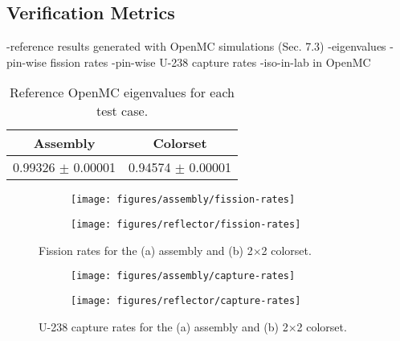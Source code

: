 \subsection{Verification Metrics}
\label{subsec:metrics}

-reference results generated with OpenMC simulations (Sec. 7.3)
-eigenvalues
-pin-wise fission rates
-pin-wise U-238 capture rates
-iso-in-lab in OpenMC

\begin{table}[h!]
  \centering
  \caption{Reference OpenMC eigenvalues for each test case.}
  \label{tab:keff-reference} 
  \begin{tabular}{c c}
  \toprule
  {\bf Assembly} &
  {\bf Colorset} \\
  \midrule
  0.99326 $\pm$ 0.00001 & 0.94574 $\pm$ 0.00001 \\
  \bottomrule
\end{tabular}
\end{table}

\begin{figure}[h!]
\centering
\begin{subfigure}{0.45\textwidth}
  \texttt{[image: figures/assembly/fission-rates]}
  \caption{}
  \label{fig:fiss-assm}
\end{subfigure}
\begin{subfigure}{0.45\textwidth}
  \centering
  \texttt{[image: figures/reflector/fission-rates]}
  \caption{}
  \label{fig:fiss-reflector}
\end{subfigure}
\caption{Fission rates for the (a) assembly and (b) 2$\times$2 colorset.}
\label{fig:fiss-rates}
\end{figure}

\begin{figure}[h!]
\centering
\begin{subfigure}{0.45\textwidth}
  \texttt{[image: figures/assembly/capture-rates]}
  \caption{}
  \label{fig:capt-assm}
\end{subfigure}
\begin{subfigure}{0.45\textwidth}
  \centering
  \texttt{[image: figures/reflector/capture-rates]}
  \caption{}
  \label{fig:capt-reflector}
\end{subfigure}
\caption{U-238 capture rates for the (a) assembly and (b) 2$\times$2 colorset.}
\label{fig:capt-rates}
\end{figure}
